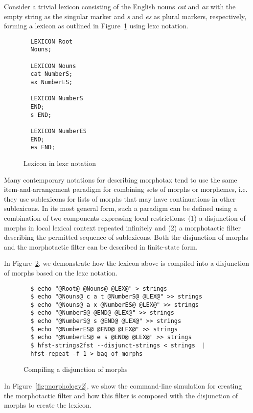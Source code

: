 \documentclass{llncs}
\begin{document}
Consider a trivial lexicon consisting of the English nouns \emph{cat} and \emph{ax} with
the empty string as the singular marker and \emph{s} and \emph{es} as plural markers, respectively,  
forming a lexicon as outlined in Figure~\ref{fig:morph0} using lexc notation.

\begin{figure} [h]
{\scriptsize
\begin{verbatim}
  LEXICON Root
  Nouns;

  LEXICON Nouns
  cat NumberS;
  ax NumberES;

  LEXICON NumberS
  END;
  s END;

  LEXICON NumberES
  END;
  es END;
\end{verbatim}
}
\caption{Lexicon in lexc notation}
\label{fig:morph0}
\end{figure}

Many contemporary notations for describing morphotax tend to use the same item-and-arrangement paradigm for
combining sets of morphs or morphemes, i.e. they use sublexicons for lists of morphs that may 
have continuations in other sublexicons. 
In its most general form, such a paradigm can be defined using a combination of two components expressing local restrictions:
(1) a disjunction of morphs in local lexical context repeated infinitely and 
(2) a morphotactic filter describing the permitted sequence of sublexicons.
Both the disjunction of morphs and the morphotactic filter can be described in finite-state form.

In Figure~\ref{fig:morphology1}, we demonstrate how the lexicon above is compiled into a disjunction of 
morphs based on the lexc notation.

\begin{figure} [h]
{\scriptsize
\begin{verbatim}
  $ echo "@Root@ @Nouns@ @LEX@" > strings
  $ echo "@Nouns@ c a t @NumberS@ @LEX@" >> strings
  $ echo "@Nouns@ a x @NumberES@ @LEX@" >> strings
  $ echo "@NumberS@ @END@ @LEX@" >> strings
  $ echo "@NumberS@ s @END@ @LEX@" >> strings
  $ echo "@NumberES@ @END@ @LEX@" >> strings
  $ echo "@NumberES@ e s @END@ @LEX@" >> strings
  $ hfst-strings2fst --disjunct-strings < strings  | 
  hfst-repeat -f 1 > bag_of_morphs
\end{verbatim}
}
\caption{Compiling a disjunction of morphs}
\label{fig:morphology1}
\end{figure}

In Figure~\ref{fig:morphology2}, we show the command-line simulation for creating the morphotactic filter and how this filter is composed with the disjunction of morphs to create the lexicon. 
\end{document}

